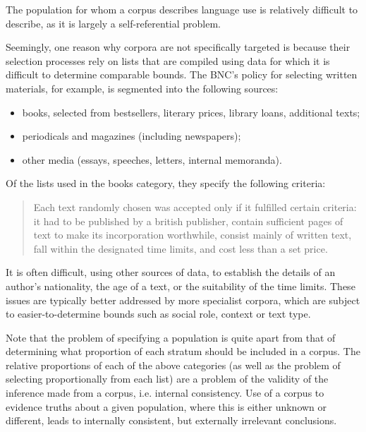 The population for whom a corpus describes language use is relatively difficult to describe, as it is largely a self-referential problem.

Seemingly, one reason why corpora are not specifically targeted is because their selection processes rely on lists that are compiled using data for which it is difficult to determine comparable bounds.  The BNC's policy for selecting written materials, for example, is segmented into the following sources:

\begin{itemize}
 \item books, selected from bestsellers, literary prices, library loans, additional texts;
 \item periodicals and magazines (including newspapers);
 \item other media (essays, speeches, letters, internal memoranda).
\end{itemize}

Of the lists used in the books category, they specify the following criteria\cite[p. 9]{burnard1995users}:

\begin{quote}
Each text randomly chosen was accepted only if it fulfilled certain criteria: it had to be published by a british publisher, contain sufficient pages of text to make its incorporation worthwhile, consist mainly of written text, fall within the designated time limits, and cost less than a set price.
\end{quote}

It is often difficult, using other sources of data, to establish the details of an author's nationality, the age of a text, or the suitability of the time limits\cite{dollinger2006oh}.
These issues are typically better addressed by more specialist corpora, which are subject to easier-to-determine bounds such as social role, context or text type\cite{kucera2002czech,przepiorkowski2008towards,kyto1993manual}.

Note that the problem of specifying a population is quite apart from that of determining what proportion of each stratum should be included in a corpus.  The relative proportions of each of the above categories (as well as the problem of selecting proportionally from each list) are a problem of the validity of the inference made from a corpus, i.e. internal consistency.  Use of a corpus to evidence truths about a given population, where this is either unknown or different, leads to internally consistent, but externally irrelevant conclusions.

